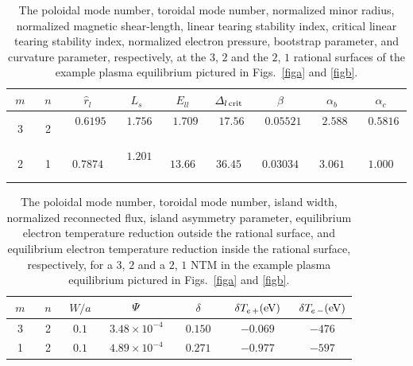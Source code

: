 \documentclass[12pt,prb,aps]{revtex4-1}
\begin{document}
\newpage
\begin{table}
\begin{tabular}{ccccccccc}
\hline
$m$ & $n$ & $\hat{r}_l$ & $L_s$ & $E_{ll}$ & ${\mit\Delta}_{l\,{\rm crit}}$ & $\hat{\beta}$ & $\alpha_b$ & $\alpha_c$\\[0.5ex]\hline
~3~&~2~ & ~$0.6195$~ & ~$1.756$~ & ~$1.709$~ & ~$17.56$~ & ~$0.05521$~ & ~$2.588$~ & ~$0.5816$~\\[0.5ex]
2& 1& $0.7874$  & ~$1.201$~&$ 13.66$ & $36.45$ & $0.03034$ & $3.061$ & $1.000$\\\hline
\end{tabular}
\caption{The poloidal mode number, toroidal mode number, normalized minor radius, normalized magnetic shear-length, linear tearing stability index, critical linear tearing stability index, normalized
electron pressure, bootstrap parameter, and curvature parameter, respectively, at the $3$, $2$ and the $2$, $1$ rational surfaces of the example
plasma equilibrium pictured in Figs.~\ref{figa} and \ref{figb}. \label{t1} }
\end{table}

\begin{table}
\begin{tabular}{ccccccc}
\hline
$m$ & $n$ & $W/a$ & ${\mit\Psi}$ & $\delta$ & ~$\delta T_{e\,+}({\rm eV})$~ & $\delta T_{e\,-}({\rm eV})$ \\[0.5ex]\hline
3& 2& $0.1$  & ~$3.48\times 10^{-4}$~&$0.150$ & $-0.069$ & $-476$\\[0.5ex]
~1~&~2~ & ~$0.1$~ & ~$4.89\times 10^{-4}$~ & ~$0.271$~ & ~$-0.977$~ & ~$-597$~\\\hline
\end{tabular}
\caption{The poloidal mode number, toroidal mode number, island width, normalized reconnected flux, island asymmetry parameter, equilibrium electron temperature reduction
outside the rational surface,  and equilibrium electron temperature reduction
inside the rational surface, respectively, for a $3$, $2$ and a $2$, $1$ NTM in the example
plasma equilibrium pictured in Figs.~\ref{figa} and \ref{figb}.  \label{t2} }
\end{table}
\end{document}

